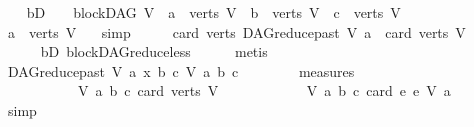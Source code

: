 \begin{isabellebody}
\ \ \isamarkupfalse%
\ bD{\isacharcolon}{\kern0pt}\ {\isachardoublequoteopen}\ {\isasymnot}\ {\isacharparenleft}{\kern0pt}{\isasymnot}\ blockDAG\ V\ {\isasymor}\ a\ {\isasymnotin}\ verts\ V\ {\isasymor}\ b\ {\isasymnotin}\ verts\ V\ {\isasymor}\ c\ {\isasymnotin}\ verts\ V{\isacharparenright}{\kern0pt}{\isachardoublequoteclose}\isanewline
\ \ \isamarkupfalse%
\ \isamarkupfalse%
\ {\isachardoublequoteopen}a\ {\isasymin}\ verts\ V{\isachardoublequoteclose}\ \ \isamarkupfalse%
\ simp\isanewline
\ \ \isamarkupfalse%
\ \isamarkupfalse%
\ {\isachardoublequoteopen}card\ {\isacharparenleft}{\kern0pt}verts\ {\isacharparenleft}{\kern0pt}DAG{\isachardot}{\kern0pt}reduce{\isacharunderscore}{\kern0pt}past\ V\ a{\isacharparenright}{\kern0pt}{\isacharparenright}{\kern0pt}\ {\isacharless}{\kern0pt}\ card\ {\isacharparenleft}{\kern0pt}verts\ V{\isacharparenright}{\kern0pt}{\isachardoublequoteclose}\ \ \ \isanewline
\ \ \ \ \isamarkupfalse%
\ bD\ blockDAG{\isachardot}{\kern0pt}reduce{\isacharunderscore}{\kern0pt}less\isanewline
\ \ \ \ \isamarkupfalse%
\ metis\isanewline
\ \ \isamarkupfalse%
\ \isamarkupfalse%
\ {\isachardoublequoteopen}{\isacharparenleft}{\kern0pt}{\isacharparenleft}{\kern0pt}DAG{\isachardot}{\kern0pt}reduce{\isacharunderscore}{\kern0pt}past\ V\ a{\isacharcomma}{\kern0pt}\ x{\isacharcomma}{\kern0pt}\ b{\isacharcomma}{\kern0pt}\ c{\isacharparenright}{\kern0pt}{\isacharcomma}{\kern0pt}\ V{\isacharcomma}{\kern0pt}\ a{\isacharcomma}{\kern0pt}\ b{\isacharcomma}{\kern0pt}\ c{\isacharparenright}{\kern0pt}\isanewline
\ \ \ \ \ \ \ {\isasymin}\ measures\isanewline
\ \ \ \ \ \ \ \ \ \ \ {\isacharbrackleft}{\kern0pt}{\isasymlambda}{\isacharparenleft}{\kern0pt}V{\isacharcomma}{\kern0pt}\ a{\isacharcomma}{\kern0pt}\ b{\isacharcomma}{\kern0pt}\ c{\isacharparenright}{\kern0pt}{\isachardot}{\kern0pt}\ card\ {\isacharparenleft}{\kern0pt}verts\ V{\isacharparenright}{\kern0pt}{\isacharcomma}{\kern0pt}\isanewline
\ \ \ \ \ \ \ \ \ \ \ \ {\isasymlambda}{\isacharparenleft}{\kern0pt}V{\isacharcomma}{\kern0pt}\ a{\isacharcomma}{\kern0pt}\ b{\isacharcomma}{\kern0pt}\ c{\isacharparenright}{\kern0pt}{\isachardot}{\kern0pt}\ card\ {\isacharbraceleft}{\kern0pt}e{\isachardot}{\kern0pt}\ e\ {\isasymrightarrow}\isactrlsup {\isacharasterisk}{\kern0pt}\isactrlbsub V\isactrlesub \ a{\isacharbraceright}{\kern0pt}{\isacharbrackright}{\kern0pt}{\isachardoublequoteclose}\isanewline
\ \ \ \ \isamarkupfalse%
\ simp\isanewline

\end{isabellebody}

